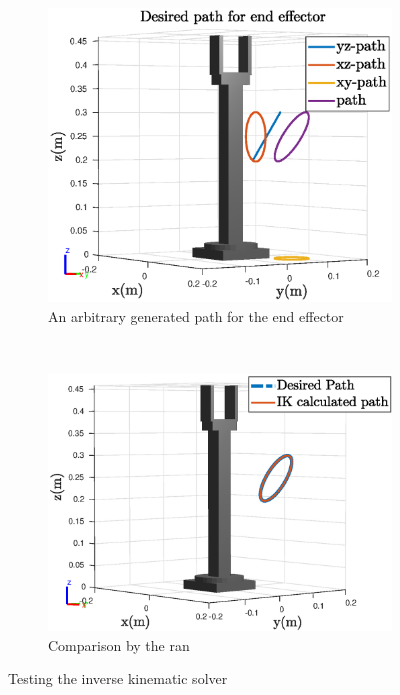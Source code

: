 \def\picsSiz{1.08}
\begin{figure}[htbp]
    \centering
    \begin{subfigure}[htbp]{0.48\textwidth}
        \centering
        \includegraphics[width = \picsSiz\linewidth]{img/pathRob.eps}
        \caption{An arbitrary generated path for the end effector}
        \label{fig:oath}
    \end{subfigure}
    ~ 
    \begin{subfigure}[htbp]{0.48\textwidth}
        \centering
        \includegraphics[width = \picsSiz\linewidth]{img/compIK.eps}
        \caption{Comparison by the ran}
        \label{fig:compa}
    \end{subfigure}
    \caption{Testing the inverse kinematic solver}
    \label{fig:IKcom}
\end{figure}

